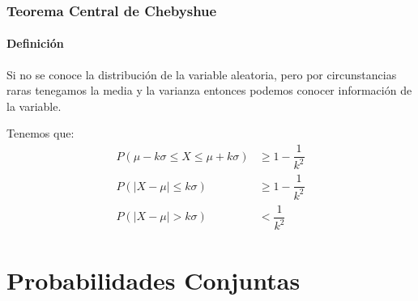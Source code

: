 \documentclass[12pt, fleqn]{report}                             %
\theoremstyle{break}                                            %
\begin{document}
        \vspace{1em}
        \section{Teorema Central de Chebyshue}

            \subsection{Definición}

                Si no se conoce la distribución de la variable aleatoria, pero por circunstancias
                raras tenegamos la media y la varianza entonces podemos conocer información de
                la variable.

                
                Tenemos que:
                \begin{align*}
                    P(\mu -k\sigma \leq X \leq \mu + k\sigma) &\geq 1 - \dfrac{1}{k^2}      \\   
                    P(|X - \mu| \leq k\sigma) &\geq 1 - \dfrac{1}{k^2}                      \\   
                    P(|X - \mu| > k\sigma) &< \dfrac{1}{k^2}     
                \end{align*}      







\part{Probabilidades Conjuntas}
\clearpage



\end{document}
